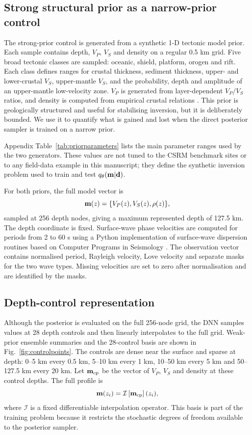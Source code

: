\documentclass[referee]{gji}
\begin{document}
\subsection{Strong structural prior as a narrow-prior control}

The strong-prior control is generated from a synthetic 1-D tectonic model prior. Each sample contains depth, $V_P$, $V_S$ and density on a regular 0.5 km grid. Five broad tectonic classes are sampled: oceanic, shield, platform, orogen and rift. Each class defines ranges for crustal thickness, sediment thickness, upper- and lower-crustal $V_S$, upper-mantle $V_S$, and the probability, depth and amplitude of an upper-mantle low-velocity zone. $V_P$ is generated from layer-dependent $V_P/V_S$ ratios, and density is computed from empirical crustal relations \citep{Brocher2005}. This prior is geologically structured and useful for stabilising inversion, but it is deliberately bounded. We use it to quantify what is gained and lost when the direct posterior sampler is trained on a narrow prior.

Appendix Table~\ref{tab:priorparameters} lists the main parameter ranges used by the two generators. These values are not tuned to the CSRM benchmark sites or to any field-data example in this manuscript; they define the synthetic inversion problem used to train and test $q_\theta({\bf m}|{\bf d})$.

For both priors, the full model vector is
\begin{equation}
{\bf m}(z)=\{V_P(z),V_S(z),\rho(z)\},
\end{equation}
sampled at 256 depth nodes, giving a maximum represented depth of 127.5 km. The depth coordinate is fixed. Surface-wave phase velocities are computed for periods from 2 to 60 s using a Python implementation of surface-wave dispersion routines based on Computer Programs in Seismology \citep{Herrmann2013,LuuDisba}. The observation vector contains normalised period, Rayleigh velocity, Love velocity and separate masks for the two wave types. Missing velocities are set to zero after normalisation and are identified by the masks.

\subsection{Depth-control representation}

Although the posterior is evaluated on the full 256-node grid, the DNN samples values at 28 depth controls and then linearly interpolates to the full grid. Weak-prior ensemble summaries and the 28-control basis are shown in Fig.~\ref{fig:controlpoints}. The controls are dense near the surface and sparse at depth: 0--5 km every 0.5 km, 5--10 km every 1 km, 10--50 km every 5 km and 50--127.5 km every 20 km. Let ${\bf m}_{\rm cp}$ be the vector of $V_P$, $V_S$ and density at these control depths. The full profile is
\begin{equation}
{\bf m}(z_i)=\mathcal{I}\left[{\bf m}_{\rm cp}\right](z_i),
\end{equation}
where $\mathcal{I}$ is a fixed differentiable interpolation operator. This basis is part of the training problem because it restricts the stochastic degrees of freedom available to the posterior sampler.
\end{document}
